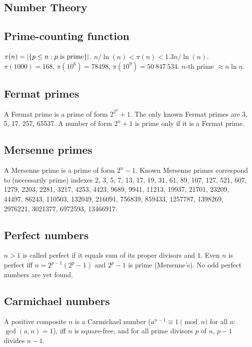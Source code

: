 \documentclass[12pt]{extarticle}
\begin{document}
\begin{multicols*}{2}


\section{Number Theory}


\subsection{Prime-counting function} $\pi(n) = |\{p \le n : p \hbox{ is prime}\}|$.
$n/\ln(n) < \pi(n) < 1.3 n/\ln(n)$.
$\pi(1000) = 168$, $\pi(10^6) = 78498$, $\pi(10^9) = 50\ 847\ 534$.
\quad $n$-th prime $\approx n \ln n$.

\subsection{Fermat primes}  A Fermat prime is a prime of form $2^{2^n}+1$.
The only known Fermat primes are 3, 5, 17, 257, 65537.
A number of form $2^n+1$ is prime only if it is a Fermat prime.

\subsection{Mersenne primes}  A Mersenne prime is a prime of form $2^n-1$.
Known Mersenne primes correspond to (necessarily prime) indexes
2, 3, 5, 7, 13, 17, 19, 31, 61, 89, 107, 127, 521, 607, 1279,
2203, 2281, 3217, 4253, 4423, 9689, 9941, 11213, 19937,
21701, 23209, 44497, 86243, 110503, 132049, 216091,
756839, 859433, 1257787, 1398269, 2976221, 3021377,
6972593, 13466917.

\subsection{Perfect numbers}  $n>1$ is called perfect if it equals
sum of its proper divisors and $1$.  Even $n$ is perfect iff $n = 2^{p-1} (2^p - 1)$
and $2^p - 1$ is prime (Mersenne's). No odd perfect numbers are yet found.

\subsection{Carmichael numbers}
A positive composite $n$ is a Carmichael number
($a^{n-1} \equiv 1 \pmod{n}$ for all $a$: $\gcd(a,n)=1$),
iff $n$ is square-free, and for all prime divisors $p$ of $n$, $p-1$ divides $n-1$.


\end{multicols*}
\end{document}
